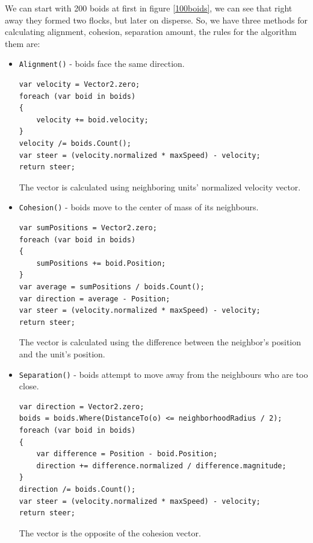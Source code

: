 \documentclass[a4paper, 12pt]{book}
\begin{document}
We can start with 200 boids at first in figure \ref{100boids}, we can see that right away they formed two flocks, but later on disperse. So, we have three methods for calculating alignment, cohesion, separation amount, the rules for the algorithm them are:
\begin{itemize}
    \item \texttt{Alignment()} - boids face the same direction.

\lstset{style=sharpc}
\begin{lstlisting}
var velocity = Vector2.zero;
foreach (var boid in boids)
{
    velocity += boid.velocity;
}
velocity /= boids.Count();
var steer = (velocity.normalized * maxSpeed) - velocity;
return steer;
\end{lstlisting}

    The vector is calculated using neighboring units' normalized velocity vector.
    \item \texttt{Cohesion()} - boids move to the center of mass of its neighbours.

\begin{lstlisting}
var sumPositions = Vector2.zero;
foreach (var boid in boids)
{
    sumPositions += boid.Position;
}
var average = sumPositions / boids.Count();
var direction = average - Position;
var steer = (velocity.normalized * maxSpeed) - velocity;
return steer;
\end{lstlisting}

    The vector is calculated using the difference between the neighbor's position and the unit's position.
    \item \texttt{Separation()} - boids attempt to move away from the neighbours who are too close.

\begin{lstlisting}
var direction = Vector2.zero;
boids = boids.Where(DistanceTo(o) <= neighborhoodRadius / 2);
foreach (var boid in boids)
{
    var difference = Position - boid.Position;
    direction += difference.normalized / difference.magnitude;
}
direction /= boids.Count();
var steer = (velocity.normalized * maxSpeed) - velocity;
return steer;
\end{lstlisting}

    The vector is the opposite of the cohesion vector.
\end{itemize}
\end{document}

